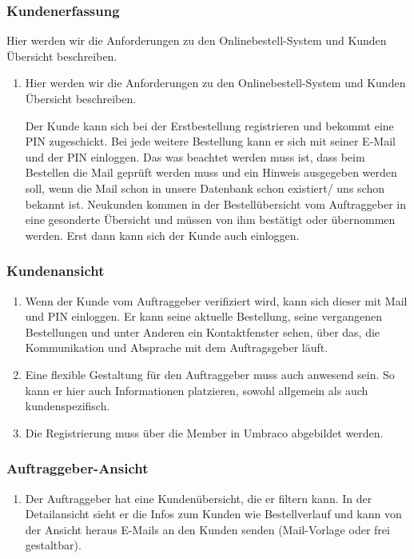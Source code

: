 \subsubsection{Kundenerfassung}
Hier werden wir die Anforderungen zu den Onlinebestell-System und Kunden Übersicht beschreiben.
\begin{enumerate}
	\item Hier werden wir die Anforderungen zu den Onlinebestell-System und Kunden Übersicht beschreiben.
	
	Der Kunde kann sich bei der Erstbestellung registrieren und bekommt eine PIN zugeschickt. Bei jede weitere Bestellung kann er sich mit seiner E-Mail und der PIN einloggen. Das was beachtet werden muss ist, dass beim Bestellen die Mail geprüft werden muss und ein Hinweis ausgegeben werden soll, wenn die Mail schon in unsere Datenbank schon existiert/ uns schon bekannt ist. Neukunden kommen in der Bestellübersicht vom Auftraggeber in eine gesonderte Übersicht und müssen von ihm bestätigt oder übernommen werden. Erst dann kann sich der Kunde auch einloggen.
	
\end{enumerate} 

\subsubsection{Kundenansicht}

\begin{enumerate}
	\item Wenn der Kunde vom Auftraggeber verifiziert wird, kann sich dieser mit Mail und PIN einloggen. Er kann seine aktuelle Bestellung, seine vergangenen Bestellungen und unter Anderen ein Kontaktfenster sehen, über das, die Kommunikation und Absprache mit dem Auftragsgeber läuft.
	\item Eine flexible Gestaltung für den Auftraggeber muss auch anwesend sein. So kann er hier auch Informationen platzieren, sowohl allgemein als auch kundenspezifisch.
	\item Die Registrierung muss über die Member in Umbraco abgebildet werden.
\end{enumerate} 

\subsubsection{Auftraggeber-Ansicht}

\begin{enumerate}
\item Der Auftraggeber hat eine Kundenübersicht, die er filtern kann. In der Detailansicht sieht er die Infos zum Kunden wie Bestellverlauf und kann von der Ansicht heraus E-Mails an den Kunden senden (Mail-Vorlage oder frei gestaltbar).
\end{enumerate} 


